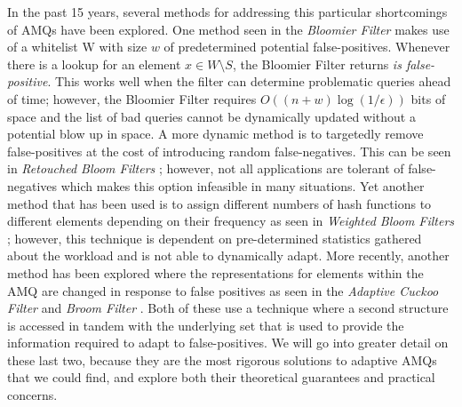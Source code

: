 \documentclass[../paper.tex]{subfiles}
\begin{document}
In the past 15 years, several methods for addressing this particular shortcomings of AMQs have been explored.  
One method seen in the {\it Bloomier Filter} \cite{bloomier-filter} makes use of a whitelist 
W with size $w$ of predetermined potential false-positives.  Whenever there is a lookup 
for an element $x \in W \setminus S$, the Bloomier Filter returns \textit{is false-positive}.   
This works well when the filter can determine problematic queries ahead of time; however, the 
Bloomier Filter requires $O((n+w)\log(1/\epsilon))$ bits of space and the list of bad queries 
cannot be dynamically updated without a potential blow up in space. A more dynamic 
method is to targetedly remove false-positives at the cost of 
introducing random false-negatives.  This can be seen in {\it Retouched Bloom Filters} 
\cite{retouched-filter}; however, not all applications are tolerant of false-negatives 
which makes this option infeasible in many situations.  Yet another method 
that has been used is to assign different numbers of hash functions to different elements
depending on their frequency as seen in {\it Weighted Bloom Filters} \cite{weighted-filter};
however, this technique is dependent on pre-determined statistics gathered about the workload and is not able to dynamically
adapt.  More recently, another method has been explored where the representations for 
elements within the AMQ are changed in response to false positives as seen in the {\it 
Adaptive Cuckoo Filter} \cite{adaptive-cuckoo} and {\it Broom Filter} \cite{broom-filter}. 
Both of these use a technique where a second structure is accessed in tandem 
with the underlying set that is used to provide the information required to adapt to 
false-positives.  We will go into greater detail on these last two, because they are the most
rigorous solutions to adaptive AMQs that we could find, and explore both their theoretical guarantees
and practical concerns.  
\end{document}
